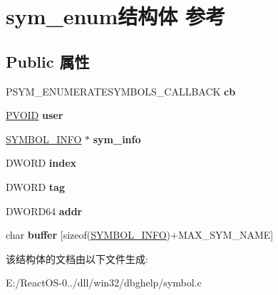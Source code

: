 \hypertarget{structsym__enum}{}\section{sym\+\_\+enum结构体 参考}
\label{structsym__enum}
\subsection*{Public 属性}
\begin{DoxyCompactItemize}
\item 
\mbox{\label{structsym__enum_af91514823cf85651e1442213b948f27f}} 
P\+S\+Y\+M\+\_\+\+E\+N\+U\+M\+E\+R\+A\+T\+E\+S\+Y\+M\+B\+O\+L\+S\+\_\+\+C\+A\+L\+L\+B\+A\+CK {\bfseries cb}
\item 
\mbox{\label{structsym__enum_a807202bd258ca2c49258e376fd832bc5}} 
\hyperlink{interfacevoid}{P\+V\+O\+ID} {\bfseries user}
\item 
\mbox{\label{structsym__enum_a629b4083a9216802a3a6b20480e63069}} 
\hyperlink{struct___s_y_m_b_o_l___i_n_f_o}{S\+Y\+M\+B\+O\+L\+\_\+\+I\+N\+FO} $\ast$ {\bfseries sym\+\_\+info}
\item 
\mbox{\label{structsym__enum_ad13909472e45d7c2297731f9df73d6a6}} 
D\+W\+O\+RD {\bfseries index}
\item 
\mbox{\label{structsym__enum_a40816af652280dfbda0709d1100412f7}} 
D\+W\+O\+RD {\bfseries tag}
\item 
\mbox{\label{structsym__enum_a3382833555bac4db4a31be69dcb65a08}} 
D\+W\+O\+R\+D64 {\bfseries addr}
\item 
\mbox{\label{structsym__enum_a1b092f42331bc0ada59e0da9e7356ab9}} 
char {\bfseries buffer} \mbox{[}sizeof(\hyperlink{struct___s_y_m_b_o_l___i_n_f_o}{S\+Y\+M\+B\+O\+L\+\_\+\+I\+N\+FO})+M\+A\+X\+\_\+\+S\+Y\+M\+\_\+\+N\+A\+ME\mbox{]}
\end{DoxyCompactItemize}


该结构体的文档由以下文件生成\+:\begin{DoxyCompactItemize}
\item 
E\+:/\+React\+O\+S-\/0../dll/win32/dbghelp/symbol.\+c\end{DoxyCompactItemize}
